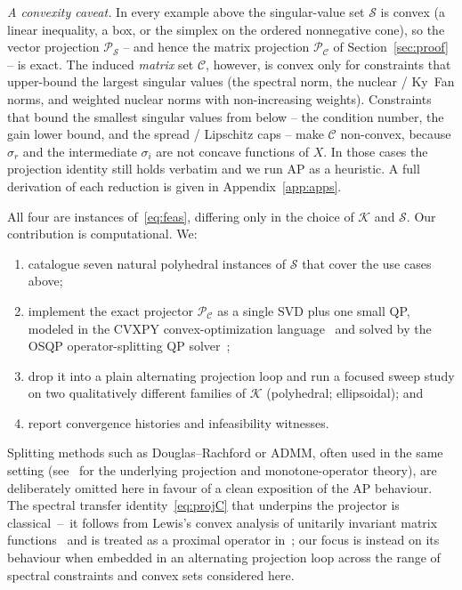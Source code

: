 \documentclass[journal]{IEEEtran}
\newcommand{\sgm}{\sigma}
\newcommand{\proj}{\mathcal{P}}
\newcommand{\spec}{\mathcal{S}}
\newcommand{\Kset}{\mathcal{K}}
\newcommand{\Cset}{\mathcal{C}}
\begin{document}
\textit{A convexity caveat.} In every example above the singular-value
set $\spec$ is convex (a linear inequality, a box, or the simplex on the
ordered nonnegative cone), so the vector projection $\proj_\spec$ -- and
hence the matrix projection $\proj_\Cset$ of Section~\ref{sec:proof} -- is
exact. The induced \emph{matrix} set $\Cset$, however, is convex only for
constraints that upper-bound the largest singular values (the spectral
norm, the nuclear / Ky~Fan norms, and weighted nuclear norms with
non-increasing weights). Constraints that bound the smallest singular
values from below -- the condition number, the gain lower bound, and the
spread / Lipschitz caps -- make $\Cset$ non-convex, because $\sgm_r$ and
the intermediate $\sgm_i$ are not concave functions of $X$. In those
cases the projection identity still holds verbatim and we run AP as a
heuristic. A full derivation of each reduction is given in
Appendix~\ref{app:apps}.

All four are instances of~\eqref{eq:feas}, differing only in the choice
of $\Kset$ and $\spec$. Our contribution is computational. We:
\begin{enumerate}
\item catalogue seven natural polyhedral instances of $\spec$ that cover
the use cases above;
\item implement the exact projector $\proj_\Cset$ as a single SVD plus
one small QP, modeled in the CVXPY convex-optimization
language~\cite{cvxpy} and solved by the OSQP operator-splitting QP
solver~\cite{osqp};
\item drop it into a plain alternating projection loop and run a focused
sweep study on two qualitatively different families of $\Kset$
(polyhedral; ellipsoidal); and
\item report convergence histories and infeasibility witnesses.
\end{enumerate}
Splitting methods such as Douglas--Rachford or ADMM, often used in
the same setting (see~\cite{bauschke} for the underlying projection and
monotone-operator theory), are deliberately omitted here in favour of a
clean exposition of the AP behaviour. The spectral transfer
identity~\eqref{eq:projC} that underpins the projector is
classical~--~it follows from Lewis's convex analysis of unitarily
invariant matrix functions~\cite{lewis1995} and is treated as a proximal
operator in~\cite{beck}; our focus is instead on its behaviour when
embedded in an alternating projection loop across the range of spectral
constraints and convex sets considered here.
\end{document}
